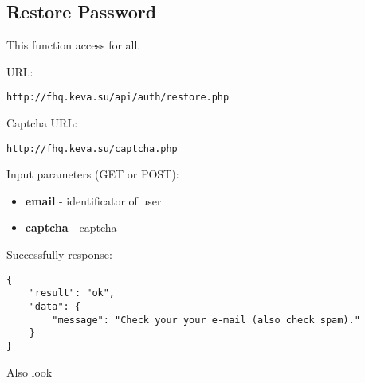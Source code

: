 \subsection{Restore Password}
\par

This function access for all.

URL:
\begin{Verbatim}[frame=single]
http://fhq.keva.su/api/auth/restore.php
\end{Verbatim}

Captcha URL:
\begin{Verbatim}[frame=single]
http://fhq.keva.su/captcha.php
\end{Verbatim}

Input parameters (GET or POST):
\begin{itemize}
  \item \textbf{email} - identificator of user
  \item \textbf{captcha} - captcha
\end{itemize}

Successfully response:  \\
\begin{Verbatim}[frame=single]
{
    "result": "ok",
    "data": {
        "message": "Check your your e-mail (also check spam)."
    }
}
\end{Verbatim}

Also look ~
